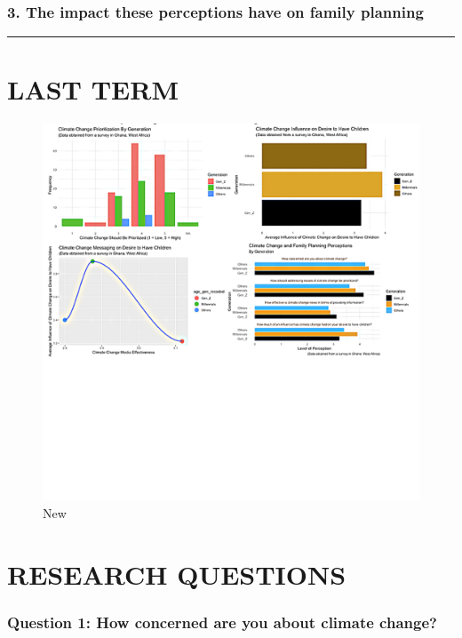 \documentclass[
]{article}
\begin{document}
\hypertarget{the-impact-these-perceptions-have-on-family-planning}{%
\subsubsection{3. The impact these perceptions have on family
planning}\label{the-impact-these-perceptions-have-on-family-planning}}

\begin{center}\rule{0.5\linewidth}{0.5pt}\end{center}

\hypertarget{last-term}{%
\section{LAST TERM}\label{last-term}}

\begin{figure}
\centering
\includegraphics{v1.png}
\caption{New}
\end{figure}

\hypertarget{research-questions}{%
\section{RESEARCH QUESTIONS}\label{research-questions}}

\hypertarget{question-1-how-concerned-are-you-about-climate-change}{%
\subsubsection{Question 1: How concerned are you about climate
change?}\label{question-1-how-concerned-are-you-about-climate-change}}
\end{document}
